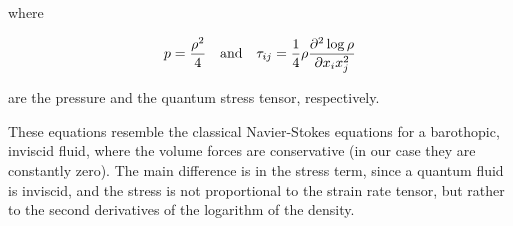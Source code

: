 where 

\[
    p = \frac{\rho^2}{4} \quad \text{and} \quad \tau_{ij} = \frac14 \rho \frac{\partial^{2} \log \rho}{\partial x_i x_j^{2}}
\]

are the pressure and the quantum stress tensor, respectively. 

These equations resemble the classical Navier-Stokes equations for a barothopic, inviscid fluid, where the volume forces are conservative (in our case they are constantly zero). The main difference is in the stress term, since a quantum fluid is inviscid, and the stress is not proportional to the strain rate tensor, but rather to the second derivatives of the logarithm of the density.



